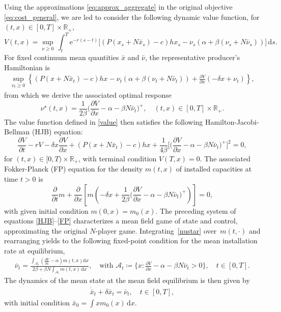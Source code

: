 \documentclass[12pt]{article}
\def \R{\mathbb{R}}
\def\erm{\mathrm{e}}
\def\drm{\mathrm{d}}
\begin{document}
Using the approximations \eqref{eq:approx_aggregate} in the original objective \eqref{eq:cost_general}, we are led to consider the following dynamic value function, for $(t,x) \in [0,T] \times \R_+$,
\begin{equation}\label{value}
V(t,x)=\sup_{\nu\geq0}\,\int_{t}^{T} \erm^{-r(s-t)}\Big[(P(x_s + N\bar{x}_s)-c)hx_s-\nu_s(\alpha+\beta(\nu_s+N\bar{\nu}_s))\Big]\, \drm s.
\end{equation}
For fixed continuum mean quantities $\bar{x}$ and $\bar{\nu}$, the representative producer's Hamiltonian is
\begin{align*}
    \sup_{\nu_t \geq0} \left\{\left(  P(x+N\bar{x}_t) - c \right) hx  -\nu_t(\alpha+\beta(\nu_t+N\bar{\nu}_t)) + \frac{\partial V}{\partial x} \left( -\delta x + \nu_t \right) \right\},
\end{align*}
from which we derive the associated optimal response
\begin{equation}\label{nustar}
\nu^\star(t,x)=\frac{1}{2\beta} \bigg(\dfrac{\partial V}{\partial x}-\alpha-\beta N\bar{\nu}_t \bigg)^+, \quad (t,x) \in [0,T] \times \R_+.
\end{equation}
The value function defined in \eqref{value} then satisfies the following Hamilton-Jacobi-Bellman (HJB) equation:
\begin{equation}\label{HJB}
\frac{\partial V}{\partial t}-rV-\delta x\frac{\partial V}{\partial x}+(P(x+N\bar{x}_t)-c)hx+\frac{1}{4\beta} \bigg[ \bigg(\dfrac{\partial V }{\partial x}-\alpha-\beta N\bar{\nu}_t \bigg)^+ \bigg]^2=0,
\end{equation}
for $(t,x) \in [0,T) \times \R_+$, with terminal condition $V(T,x)=0$.
The associated Fokker-Planck (FP) equation for the density $m(t,x)$ of installed capacities at time $t>0$ is 
\begin{equation}\label{FP}
\frac{\partial }{\partial t}m+\frac{\partial }{\partial x}\left[m\left(-\delta x+\frac{1}{2\beta} \bigg(\frac{\partial V}{\partial x}-\alpha-\beta N\bar{\nu}_t \bigg)^+ \right)\right]=0,
\end{equation}
with given initial condition $m(0,x)=m_0(x)$. The preceding system of equations \eqref{HJB}--\eqref{FP} characterizes a mean field game of state and control, approximating the original $N$-player game. Integrating~\eqref{nustar} over~$m(t,\cdot)$ and rearranging yields to the following fixed-point condition for the mean installation rate at equilibrium,
\begin{align}\label{nubarformula}
\bar{\nu}_t=\frac{\int_{\mathcal{A}_t} (\frac{\partial V}{\partial x}-\alpha) m(t,x) \drm x}{2\beta+\beta N\int_{\mathcal{A}_t}m(t,x)\,\drm x},
\quad \text{with } \mathcal{A}_t \coloneq \bigg\{x:\frac{\partial V}{\partial x}-\alpha-\beta N \bar{\nu}_t>0\bigg\}, \quad t \in [0,T].
\end{align}
The dynamics of the mean state at the mean field equilibrium is then given by
\begin{align*}
   \dot{\bar{x}}_t+\delta \bar{x}_t=\bar{\nu}_t, \quad t \in [0,T],
\end{align*}
with initial condition $\bar{x}_0=\int xm_0(x)\,\drm x$.
\end{document}
